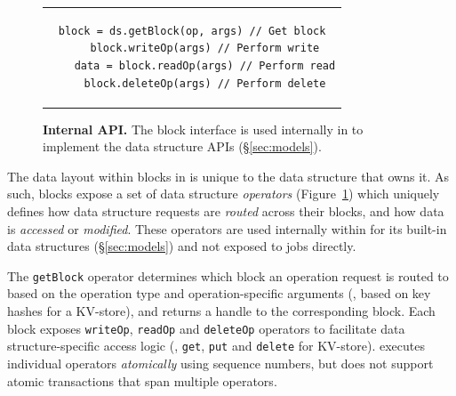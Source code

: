 \begin{figure}[h]
  \centering
  \begin{tabular}{c}
  {\begin{lstlisting}[frame=single, gobble=4, linewidth=20em]
    block = ds.getBlock(op, args) // Get block
    block.writeOp(args) // Perform write
    data = block.readOp(args) // Perform read
    block.deleteOp(args) // Perform delete
  \end{lstlisting}}
  \end{tabular}
  \caption[\jiffy Internal API]{\textbf{\jiffy Internal API.} The block interface is used internally in \jiffy to implement the data structure APIs (\S\ref{sec:models}).}  
  \label{fig:blockapi}
\end{figure}

 The data layout within blocks in \jiffy is unique to the data structure that owns it. As such, \jiffy blocks expose a set of data structure \textit{operators} (Figure~\ref{fig:blockapi}) which uniquely defines how data structure requests are \textit{routed} across their blocks, and how data is \textit{accessed} or \textit{modified}. These operators are used internally within \jiffy for its built-in data structures (\S\ref{sec:models}) and not exposed to jobs directly. 

The \texttt{getBlock} operator determines which block an operation request is routed to based on the operation type and operation-specific arguments (\eg, based on key hashes for a KV-store), and returns a handle to the corresponding block. Each \jiffy block exposes \texttt{writeOp}, \texttt{readOp} and \texttt{deleteOp} operators to facilitate data structure-specific access logic (\eg, \texttt{get}, \texttt{put} and \texttt{delete} for KV-store). \jiffy executes individual operators \textit{atomically} using sequence numbers, but does not support atomic transactions that span multiple operators. 

